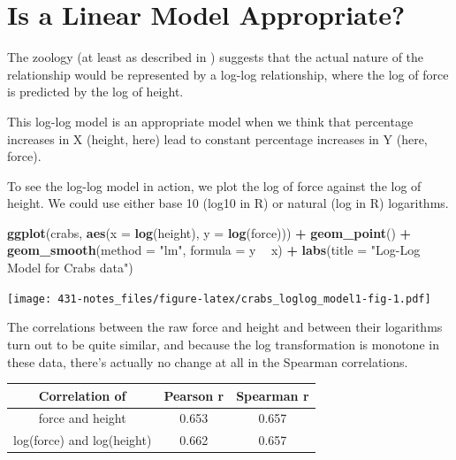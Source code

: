 \documentclass[
]{book}
\newenvironment{Shaded}{\begin{snugshade}}{\end{snugshade}}
\newcommand{\DataTypeTok}[1]{\textcolor[rgb]{0.13,0.29,0.53}{#1}}
\newcommand{\KeywordTok}[1]{\textcolor[rgb]{0.13,0.29,0.53}{\textbf{#1}}}
\newcommand{\NormalTok}[1]{#1}
\newcommand{\OperatorTok}[1]{\textcolor[rgb]{0.81,0.36,0.00}{\textbf{#1}}}
\newcommand{\StringTok}[1]{\textcolor[rgb]{0.31,0.60,0.02}{#1}}
\begin{document}
\hypertarget{is-a-linear-model-appropriate}{%
\section{Is a Linear Model Appropriate?}\label{is-a-linear-model-appropriate}}

The zoology (at least as described in \citet{RamseySchafer}) suggests that the actual nature of the relationship would be represented by a log-log relationship, where the log of force is predicted by the log of height.

This log-log model is an appropriate model when we think that percentage increases in X (height, here) lead to constant percentage increases in Y (here, force).

To see the log-log model in action, we plot the log of force against the log of height. We could use either base 10 (log10 in R) or natural (log in R) logarithms.

\begin{Shaded}
\begin{Highlighting}[]
\KeywordTok{ggplot}\NormalTok{(crabs, }\KeywordTok{aes}\NormalTok{(}\DataTypeTok{x =} \KeywordTok{log}\NormalTok{(height), }\DataTypeTok{y =} \KeywordTok{log}\NormalTok{(force))) }\OperatorTok{+}
\StringTok{    }\KeywordTok{geom_point}\NormalTok{() }\OperatorTok{+}
\StringTok{    }\KeywordTok{geom_smooth}\NormalTok{(}\DataTypeTok{method =} \StringTok{"lm"}\NormalTok{, }\DataTypeTok{formula =}\NormalTok{ y }\OperatorTok{~}\StringTok{ }\NormalTok{x) }\OperatorTok{+}\StringTok{ }
\StringTok{    }\KeywordTok{labs}\NormalTok{(}\DataTypeTok{title =} \StringTok{"Log-Log Model for Crabs data"}\NormalTok{)}
\end{Highlighting}
\end{Shaded}

\texttt{[image: 431-notes\_files/figure-latex/crabs\_loglog\_model1-fig-1.pdf]}

The correlations between the raw force and height and between their logarithms turn out to be quite similar, and because the log transformation is monotone in these data, there's actually no change at all in the Spearman correlations.

\begin{longtable}[]{@{}ccc@{}}
\toprule
Correlation of & Pearson r & Spearman r\tabularnewline
\midrule
\endhead
force and height & 0.653 & 0.657\tabularnewline
log(force) and log(height) & 0.662 & 0.657\tabularnewline
\bottomrule
\end{longtable}
\end{document}
